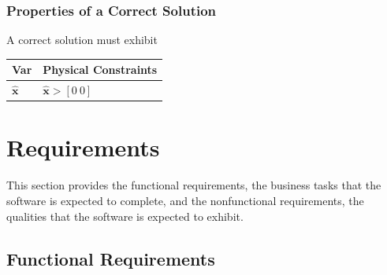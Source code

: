 \documentclass[12pt]{article}
\begin{document}

\subsubsection{Properties of a Correct Solution}\label{sec_CorrectSolution}

\noindent
A correct solution must exhibit

\begin{table}[!h]
\caption{Output Variables}\label{TblOutputVar}
\renewcommand{\arraystretch}{1.2}
\noindent \begin{longtable*}{l l} 
  \toprule
  \textbf{Var} & \textbf{Physical Constraints} \\
  \midrule 
  $\mathbf{\hat{x}}$ & $\mathbf{\hat{x}} > [0~0]$
  \\
  \bottomrule
\end{longtable*}
\end{table}

\section{Requirements}

This section provides the functional requirements, the business tasks that the
software is expected to complete, and the nonfunctional requirements, the
qualities that the software is expected to exhibit.

\subsection{Functional Requirements}
\end{document}

